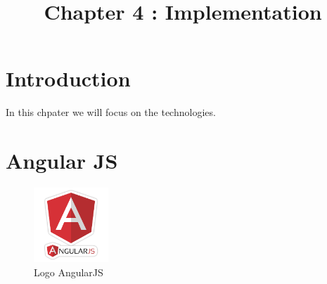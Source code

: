 \documentclass[12pt]{article}
\begin{document}
	
	
	\title{Chapter 4 : Implementation}
	\maketitle
	\section{Introduction}
	
	In this chpater we will focus on the technologies. 
	
	\section{Angular JS}
	
	
	\begin{figure}[h]
		\centering
		\includegraphics[width=0.25\textwidth]{angularjsLogo.png}
		\caption{Logo AngularJS}
		\label{fig:mesh1}
	\end{figure}
	
\end{document}
